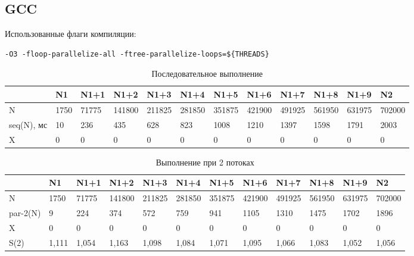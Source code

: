 \documentclass[a4paper,14pt,russian]{extarticle}
\begin{document}
\subsection{GCC}

Использованные флаги компиляции:
\begin{lstlisting}
-O3 -floop-parallelize-all -ftree-parallelize-loops=${THREADS}
\end{lstlisting}


\begin{table}[h]
	\caption{Последовательное выполнение}
	\label{gcc-seq}
	\begin{adjustbox}{width=\textwidth,nofloat=table}
			\begin{tabular}{|l|l|l|l|l|l|l|l|l|l|l|l|}
				\hline
				& N1   & N1+1  & N1+2   & N1+3   & N1+4   & N1+5   & N1+6   & N1+7   & N1+8   & N1+9   & N2     \\\hline
				N      & 1750 & 71775 & 141800 & 211825 & 281850 & 351875 & 421900 & 491925 & 561950 & 631975 & 702000 \\\hline
				seq(N), мс & 10   & 236   & 435    & 628    & 823    & 1008   & 1210   & 1397   & 1598   & 1791   & 2003   \\\hline
				X      & 0    & 0     & 0      & 0      & 0      & 0      & 0      & 0      & 0      & 0      & 0 \\\hline
			\end{tabular}
	\end{adjustbox}
\end{table}

\begin{table}[h]
	\caption{Выполнение при 2 потоках}
	\label{gcc-2}
	\begin{adjustbox}{width=\textwidth,nofloat=table}
	\begin{tabular}{|l|l|l|l|l|l|l|l|l|l|l|l|}
		\hline
		& N1   & N1+1  & N1+2   & N1+3   & N1+4   & N1+5   & N1+6   & N1+7   & N1+8   & N1+9   & N2     \\\hline
		N        & 1750        & 71775       & 141800      & 211825      & 281850      & 351875     & 421900      & 491925      & 561950      & 631975      & 702000      \\ \hline
		par-2(N) & 9           & 224         & 374         & 572         & 759         & 941        & 1105        & 1310        & 1475        & 1702        & 1896        \\ \hline
		X        & 0           & 0           & 0           & 0           & 0           & 0          & 0           & 0           & 0           & 0           & 0           \\ \hline
		S(2)  & 1,111 & 1,054 & 1,163  & 1,098  & 1,084  & 1,071  & 1,095  & 1,066  & 1,083  & 1,052  & 1,056  \\ \hline
	\end{tabular}
	\end{adjustbox}
\end{table}
\end{document}

